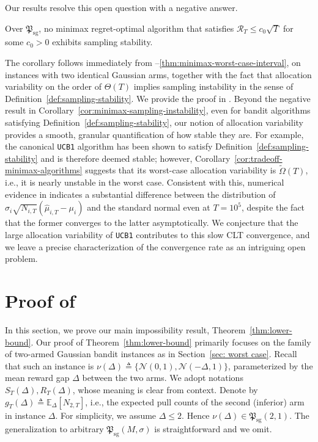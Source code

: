 \documentclass[nonblindrev]{informs3_noinforms}
\begin{document}
Our results resolve this open question with a negative answer. 
\begin{corollary}\label{cor:minimax-sampling-instability} Over $\mathfrak{P}_{\mathrm{sg}}$, no minimax regret-optimal algorithm that satisfies $\mathcal{R}_T \leq c_0 \sqrt{T}$ for some $c_0>0$ exhibits sampling stability.
\end{corollary}
The corollary follows immediately from --\ref{thm:minimax-worst-case-interval}, on instances with two identical Gaussian arms, together with the fact that allocation variability on the order of $\Theta(T)$ implies sampling instability in the sense of Definition~\ref{def:sampling-stability}. We provide the proof in . Beyond the negative result in Corollary~\ref{cor:minimax-sampling-instability}, even for bandit algorithms satisfying Definition~\ref{def:sampling-stability}, our notion of allocation variability provides a smooth, granular quantification of how stable they are. For example, the canonical \texttt{UCB1} algorithm has been shown to satisfy Definition~\ref{def:sampling-stability} and is therefore deemed stable; however, Corollary~\ref{cor:tradeoff-minimax-algorithms} suggests that its worst-case allocation variability is $\tilde{\Omega}(T)$, i.e., it is nearly unstable in the worst case. Consistent with this, numerical evidence in \citet{chen2025characterization} indicates a substantial difference between the distribution of $\sigma_i\sqrt{N_{i,T}}(\hat\mu_{i,T}-\mu_i)$ and the standard normal even at $T=10^5$, despite the fact that the former converges to the latter asymptotically. We conjecture that the large allocation variability of \texttt{UCB1} contributes to this slow CLT convergence, and we leave a precise characterization of the convergence rate as an intriguing open problem.

\section{Proof of  }\label{sec:lower-bound-proof0}
In this section, we prove our main impossibility result, Theorem~\ref{thm:lower-bound}. Our proof of Theorem~\ref{thm:lower-bound} primarily focuses on the family of two-armed Gaussian bandit instances as in Section~\ref{sec: worst case}. Recall that such an instance is $\nu(\Delta) \triangleq \{\mathcal{N}(0,1), \mathcal{N}(-\Delta,1)\}$, parameterized by the mean reward gap $\Delta$ between the two arms. We adopt notations $S_T(\Delta), R_T(\Delta)$, whose meaning is clear from context. Denote by $g_T(\Delta) \triangleq \mathbb{E}_{\Delta}[N_{2, T}]$, i.e., the expected pull counts of the second (inferior) arm in instance $\Delta$. For simplicity, we assume $\Delta \le 2$. Hence $\nu(\Delta) \in \mathfrak{P}_{\text{sg}}(2,1)$. The generalization to arbitrary $\mathfrak{P}_{\text{sg}}(M,\sigma)$ is straightforward and we omit. 
\end{document}
